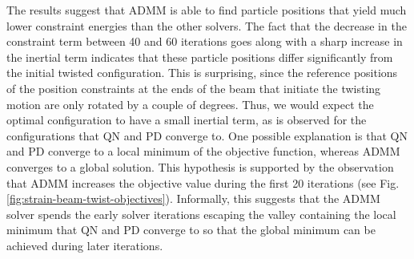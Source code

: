 The results suggest that ADMM is able to find particle positions that yield much lower constraint energies than the other solvers. The fact that the decrease in the 
constraint term between 40 and 60 iterations goes along with a sharp increase in the inertial term indicates that these particle positions differ significantly from the 
initial twisted configuration. This is surprising, since the reference positions of the position constraints at the ends of the beam that initiate the twisting motion 
are only rotated by a couple of degrees. Thus, we would expect the optimal configuration to have a small inertial term, as is observed for the configurations that 
QN and PD converge to. One possible explanation is that QN and PD converge to a local minimum of the objective function, whereas ADMM converges to a global solution. This 
hypothesis is supported by the observation that ADMM increases the objective value during the first 20 iterations (see Fig. \ref{fig:strain-beam-twist-objectives}). Informally, this 
suggests that the ADMM solver spends the early solver iterations escaping the valley containing the local minimum that QN and PD converge to so that the global minimum 
can be achieved during later iterations.

